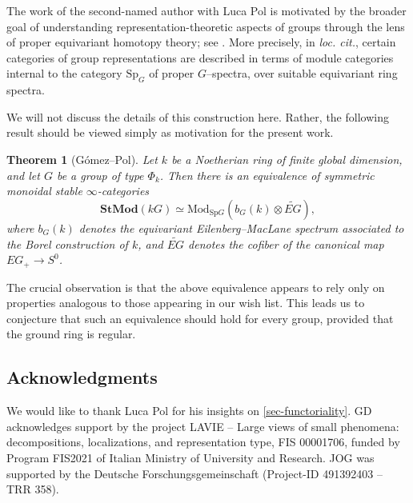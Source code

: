\documentclass{amsart}
\numberwithin{equation}{section}%
\newtheorem*{introtheorem}{Theorem}
\theoremstyle{remark}
\begin{document}
The work of the second-named author with Luca Pol \cite{GP26b} is motivated by the broader goal of understanding representation-theoretic aspects of groups through the lens of proper equivariant homotopy theory; see \cite{degrijse2023proper}. More precisely, in \textit{loc. cit.}, certain categories of group representations are described in terms of module categories internal to the category $\mathrm{Sp}_G$ of proper $G$--spectra, over suitable equivariant ring spectra.

We will not discuss the details of this construction here. Rather, the following result should be viewed 
simply as motivation for the present work.

\begin{introtheorem}
    [G\'omez--Pol]
Let $k$ be a Noetherian ring of finite global dimension, and let $G$ be a group of type $\Phi_k$. Then there is an equivalence of symmetric monoidal stable $\infty$-categories
\[
\mathbf{StMod}(kG) \simeq \mathrm{Mod}_{\mathrm{Sp}G}(b_G(k)\otimes \widetilde{EG}),
\]
where $b_G(k)$ denotes the equivariant Eilenberg--MacLane spectrum associated to the Borel construction of $k$, and $\widetilde{EG}$ denotes the cofiber of the canonical map $EG_+ \rightarrow S^0$.
\end{introtheorem}


The crucial observation is that the
above equivalence appears to rely only on properties analogous to those appearing in our wish list. This leads us to conjecture that such an equivalence should hold for every group, provided that the ground ring is regular.













\subsection*{Acknowledgments} We would like to thank Luca Pol for his insights on \cref{sec-functoriality}.    GD acknowledges support by the project LAVIE – Large views of small phenomena:
decompositions, localizations, and representation type, FIS 00001706, funded by Program FIS2021 of Italian Ministry
of University and Research. JOG was supported by the Deutsche Forschungsgemeinschaft (Project-ID 491392403 – TRR 358).
\end{document}
